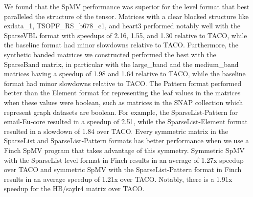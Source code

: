   We found that the SpMV performance was superior for the level format that best paralleled the structure of the tensor.
  Matrices with a clear blocked structure like exdata\_1, TSOPF\_RS\_b678\_c1, and heart3 performed notably well with the SparseVBL format with speedups of 2.16, 1.55, and 1.30 relative to TACO, while the baseline format had minor slowdowns relative to TACO.
  Furthermore, the synthetic banded matrices we constructed performed the best with the SparseBand matrix, in particular with the large\_band and the medium\_band matrices having a speedup of 1.98 and 1.64 relative to TACO, while the baseline format had minor slowdowns relative to TACO.
  The Pattern format performed better than the Element format for representing the leaf values in the matrices when these values were boolean, such as matrices in the SNAP collection which represent graph datasets are boolean. 
  For example, the SparseList-Pattern for email-Eu-core resulted in a speedup of 2.51, while the SparseList-Element format resulted in a slowdown of 1.84 over TACO.
  Every symmetric matrix in the SparseList and SparseList-Pattern formats has better performance when we use a Finch SpMV program that takes advantage of this symmetry.
  Symmetric SpMV with the SparseList level format in Finch results in an average of 1.27x speedup over TACO and symmetric SpMV with the SparseList-Pattern format in Finch results in an average speedup of 1.21x over TACO.
  Notably, there is a 1.91x speedup for the HB/saylr4 matrix over TACO. 
  
  
  
  
  
  
